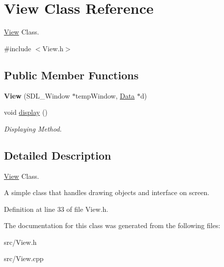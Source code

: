 \hypertarget{classView}{\section{View Class Reference}
\label{classView}
}


\hyperlink{classView}{View} Class.  




{\ttfamily \#include $<$View.\-h$>$}

\subsection*{Public Member Functions}
\begin{DoxyCompactItemize}
\item 
\hypertarget{classView_a6f8d00e1f6f4f82333c5011df934ba4d}{{\bfseries View} (S\-D\-L\-\_\-\-Window $\ast$temp\-Window, \hyperlink{classData}{Data} $\ast$d)}\label{classView_a6f8d00e1f6f4f82333c5011df934ba4d}

\item 
\hypertarget{classView_a6d56a0ed7565f87b2b6fb8c4f3d928c9}{void \hyperlink{classView_a6d56a0ed7565f87b2b6fb8c4f3d928c9}{display} ()}\label{classView_a6d56a0ed7565f87b2b6fb8c4f3d928c9}

\begin{DoxyCompactList}\small\item\em Displaying Method. \end{DoxyCompactList}\end{DoxyCompactItemize}


\subsection{Detailed Description}
\hyperlink{classView}{View} Class. 

A simple class that handles drawing objects and interface on screen. 

Definition at line 33 of file View.\-h.



The documentation for this class was generated from the following files\-:\begin{DoxyCompactItemize}
\item 
src/View.\-h\item 
src/View.\-cpp\end{DoxyCompactItemize}
